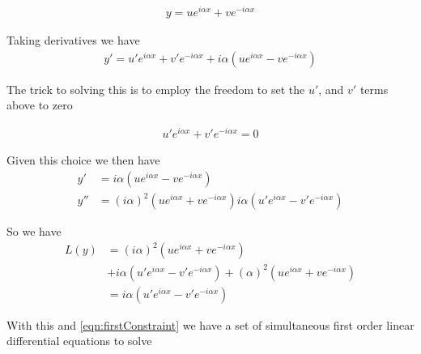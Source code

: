 \documentclass{article}
\begin{document}
\begin{align*}
y  = u e^{ i \alpha x } + v e^{ -i \alpha x }
\end{align*}

Taking derivatives we have
\begin{align*}
y' = u' e^{ i \alpha x } + v' e^{ -i \alpha x } + i \alpha (u e^{ i \alpha x } - v e^{ -i \alpha x })
\end{align*}

The trick to solving this is to employ the freedom to set the $u'$, and $v'$ terms above to zero

\begin{align}\label{eqn:firstConstraint}
u' e^{ i \alpha x } + v' e^{ -i \alpha x } = 0
\end{align}

Given this choice we then have
\begin{align*}
y' &= i \alpha (u e^{ i \alpha x } - v e^{ -i \alpha x }) \\
y'' &=
(i \alpha)^2 (u e^{ i \alpha x } + v e^{ -i \alpha x })
i \alpha (u' e^{ i \alpha x } - v' e^{ -i \alpha x })
\end{align*}

So we have
\begin{align*}
L(y)
&=
(i \alpha)^2 (u e^{ i \alpha x } + v e^{ -i \alpha x })  \\
&+i \alpha (u' e^{ i \alpha x } - v' e^{ -i \alpha x })
+ (\alpha)^2 (u e^{ i \alpha x } + v e^{ -i \alpha x })  \\
&=
i \alpha (u' e^{ i \alpha x } - v' e^{ -i \alpha x })
\end{align*}

With this and \ref{eqn:firstConstraint} we have a set of simultaneous first order linear differential equations to solve
\end{document}
